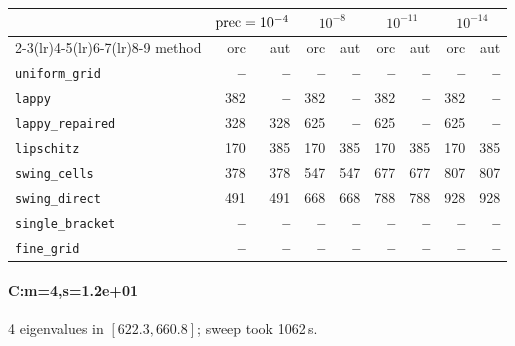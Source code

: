 \begin{center}
\small
\begin{tabular}{lrrrrrrrr}
\toprule
& \multicolumn{2}{c}{$\mathrm{prec}=10^{-4}$} & \multicolumn{2}{c}{$10^{-8}$} & \multicolumn{2}{c}{$10^{-11}$} & \multicolumn{2}{c}{$10^{-14}$} \\
\cmidrule(lr){2-3}\cmidrule(lr){4-5}\cmidrule(lr){6-7}\cmidrule(lr){8-9}
method & orc & aut & orc & aut & orc & aut & orc & aut \\
\midrule
\texttt{uniform\_grid} & \textbf{--} & \textbf{--} & \textbf{--} & \textbf{--} & \textbf{--} & \textbf{--} & \textbf{--} & \textbf{--} \\
\texttt{lappy} & 382 & \textbf{--} & 382 & \textbf{--} & 382 & \textbf{--} & 382 & \textbf{--} \\
\texttt{lappy\_repaired} & 328 & 328 & 625 & \textbf{--} & 625 & \textbf{--} & 625 & \textbf{--} \\
\texttt{lipschitz} & 170 & 385 & 170 & 385 & 170 & 385 & 170 & 385 \\
\texttt{swing\_cells} & 378 & 378 & 547 & 547 & 677 & 677 & 807 & 807 \\
\texttt{swing\_direct} & 491 & 491 & 668 & 668 & 788 & 788 & 928 & 928 \\
\midrule
\texttt{single\_bracket} & \textbf{--} & \textbf{--} & \textbf{--} & \textbf{--} & \textbf{--} & \textbf{--} & \textbf{--} & \textbf{--} \\
\texttt{fine\_grid} & \textbf{--} & \textbf{--} & \textbf{--} & \textbf{--} & \textbf{--} & \textbf{--} & \textbf{--} & \textbf{--} \\
\bottomrule
\end{tabular}
\end{center}

\paragraph{C:m=4,s=1.2e+01} 4 eigenvalues in $[622.3, 660.8]$; sweep took 1062\,s.

